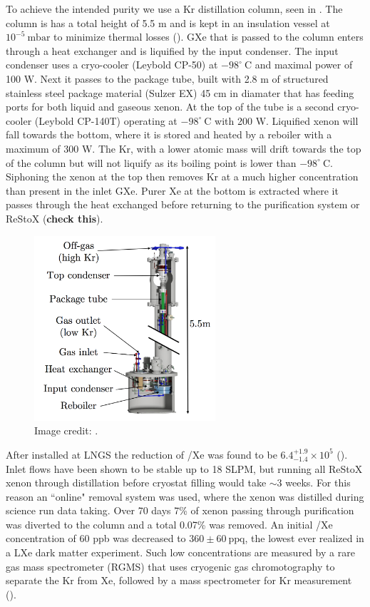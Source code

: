 To achieve the intended purity we use a Kr distillation column, seen in .  The column is has a total
height of 5.5 m and is kept in an insulation vessel at $10^{-5}\ \mathrm{mbar}$ to minimize thermal losses ().  GXe
that is passed to the column enters through a heat exchanger and is
liquified by the input condenser.  The input condenser uses a cryo-cooler (Leybold CP-50) at $-98^{\circ}\ \mathrm{C}$ and maximal power
of 100 W.  Next it passes to the package tube, built with 2.8 m of structured stainless steel package material (Sulzer EX) 45 cm in
diamater that has feeding ports for both liquid and gaseous xenon.  At the top of the tube is a second cryo-cooler (Leybold CP-140T)
operating at $-98^{\circ}\ \mathrm{C}$ with 200 W.  Liquified xenon will fall towards the bottom, where it is stored and heated by a
reboiler with a maximum of 300 W.  The Kr, with a lower atomic mass will drift towards the top of the column but will not liquify as its
boiling point is lower than $-98^{\circ}\ \mathrm{C}$.  Siphoning the xenon at the top then removes Kr at a much higher concentration than
present in the inlet GXe.  Purer Xe at the bottom is extracted where it passes through the heat exchanged before returning to the
purification system or ReStoX (\textbf{check this}).

\begin{figure}
\centering
\includegraphics[width=0.6\textwidth]{KrColumn}
\caption{Image credit: .}
\label{fig:xeno1t_kr_dist_column}
\end{figure}

After installed at LNGS the reduction of /Xe was found to be $6.4_{-1.4}^{+1.9} \times 10^{5}$
().  Inlet flows have been shown to be stable up to 18 SLPM, but running all ReStoX xenon through distillation before
cryostat filling would take ${\sim}3$ weeks.  For this reason an ``online" removal system was used, where the xenon was distilled during
science run data taking.  Over 70 days 7\% of xenon passing through purification was diverted to the column and a total 0.07\% was
removed.  An initial /Xe concentration of 60 ppb was decreased to $360 \pm 60\ \mathrm{ppq}$, the lowest ever realized in a
LXe dark matter experiment.  Such low concentrations are measured by a rare gas mass spectrometer (RGMS) that uses cryogenic gas
chromotography to separate the Kr from Xe, followed by a mass spectrometer for Kr measurement ().

